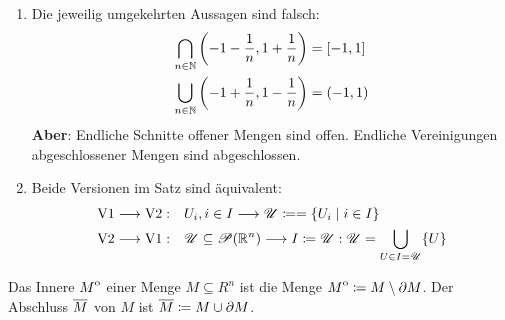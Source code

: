 \begin{bem}
    \begin{enumerate}
        \item Die jeweilig umgekehrten Aussagen sind falsch:
        \begin{align*}
            \bigcap_{n\in\mathbb{N}} \left(-1-\frac{1}{n},1+\frac{1}{n}\right) &= [-1,1]\\
            \bigcup_{n\in\mathbb{N}} \left(-1+\frac{1}{n},1-\frac{1}{n}\right) &= (-1,1)
        \end{align*}
        \textbf{Aber}: Endliche Schnitte offener Mengen sind offen. Endliche Vereinigungen abgeschlossener Mengen sind abgeschlossen.
        \item Beide Versionen im Satz sind äquivalent:
        \begin{align*}
            \mathrm{V1} \longrightarrow \mathrm{V2}:\quad& U_i, i\in I \longrightarrow \mathscr{U} \coloneqq = \{U_i \mid i\in I\}\\
            \mathrm{V2} \longrightarrow \mathrm{V1}:\quad& \mathscr{U}\subseteq \mathscr{P}(\mathbb{R}^n) \longrightarrow I \coloneqq \mathscr{U}: \mathscr{U} = \bigcup_{U\in I=\mathscr{U}}\{U\}
        \end{align*}
    \end{enumerate}
\end{bem}
\begin{defn}
    Das Innere ${\kern0ptM}^{\mathrm{o}}$ einer Menge $M\subseteq R^n$ ist die Menge ${\kern0ptM}^{\mathrm{o}} \coloneqq M \setminus \partial M$. Der Abschluss ${\overline{\kern0ptM}}$ von $M$ ist ${\overline{\kern0ptM}}\coloneqq M\cup \partial M$.
\end{defn}